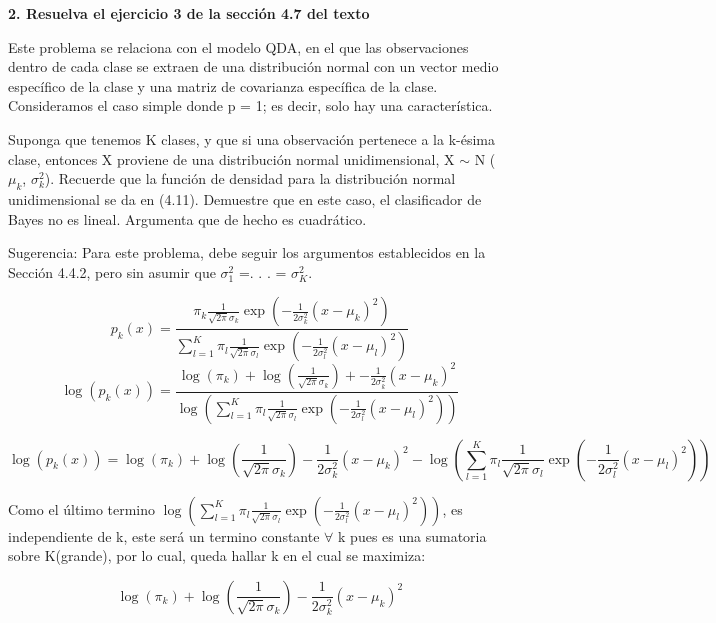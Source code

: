 \documentclass[
]{article}
\begin{document}
\textbf{2. Resuelva el ejercicio 3 de la sección 4.7 del texto}

Este problema se relaciona con el modelo QDA, en el que las
observaciones dentro de cada clase se extraen de una distribución normal
con un vector medio específico de la clase y una matriz de covarianza
específica de la clase. Consideramos el caso simple donde p = 1; es
decir, solo hay una característica.

Suponga que tenemos K clases, y que si una observación pertenece a la
k-ésima clase, entonces X proviene de una distribución normal
unidimensional, X \(\sim\) N ( \(\mu_k\), \(\sigma_k^2\)). Recuerde que
la función de densidad para la distribución normal unidimensional se da
en (4.11). Demuestre que en este caso, el clasificador de Bayes no es
lineal. Argumenta que de hecho es cuadrático.

Sugerencia: Para este problema, debe seguir los argumentos establecidos
en la Sección 4.4.2, pero sin asumir que \(\sigma_1^2\) =. . . =
\(\sigma_K^2\).

\[
p_k(x) = \frac {\pi_k
                \frac {1} {\sqrt{2 \pi} \sigma_k}
                \exp(- \frac {1} {2 \sigma_k^2} (x - \mu_k)^2)
               }
               {\sum_{l = 1}^K{
                \pi_l
                \frac {1} {\sqrt{2 \pi} \sigma_l}
                \exp(- \frac {1} {2 \sigma_l^2} (x - \mu_l)^2)
               }}
\] \[
\log(p_k(x)) = \frac {\log(\pi_k) +
                \log(\frac {1} {\sqrt{2 \pi} \sigma_k}) + 
                - \frac {1} {2 \sigma_k^2} (x - \mu_k)^2
               }
               {\log(\sum_{l = 1}^K {
                \pi_l
                \frac {1} {\sqrt{2 \pi} \sigma_l}
                \exp(- \frac {1} {2 \sigma_l^2} (x - \mu_l)^2)
               })}
\]

\[
\log(p_k(x)) = \log(\pi_k) +
                \log(\frac {1} {\sqrt{2 \pi} \sigma_k}) 
                - \frac {1} {2 \sigma_k^2} (x - \mu_k)^2
                -
               \log(\sum_{l = 1}^K {
                \pi_l
                \frac {1} {\sqrt{2 \pi} \sigma_l}
                \exp(- \frac {1} {2 \sigma_l^2} (x - \mu_l)^2)
               })
\]

Como el último termino
\(\log(\sum_{l = 1}^K {  \pi_l  \frac {1} {\sqrt{2 \pi} \sigma_l}  \exp(- \frac {1} {2 \sigma_l^2} (x - \mu_l)^2)  })\),
es independiente de k, este será un termino constante \(\forall\) k pues
es una sumatoria sobre K(grande), por lo cual, queda hallar k en el cual
se maximiza:

\[
\log(\pi_k) +
  \log(\frac {1} {\sqrt{2 \pi} \sigma_k})  
  - \frac {1} {2 \sigma_k^2} (x - \mu_k)^2
\]
\end{document}
